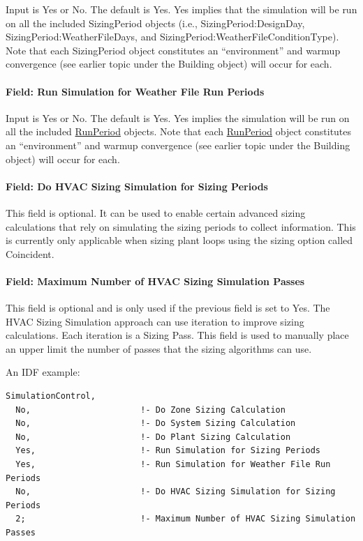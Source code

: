Input is Yes or No. The default is Yes. Yes implies that the simulation will be run on all the included SizingPeriod objects (i.e., Sizing\-Period:\-Design\-Day, Sizing\-Period:\-Weather\-File\-Days, and Sizing\-Period:\-Weather\-File\-Condition\-Type). Note that each Sizing\-Period object constitutes an ``environment'' and warmup convergence (see earlier topic under the Building object) will occur for each.

\paragraph{Field: Run Simulation for Weather File Run Periods}\label{field-run-simulation-for-weather-file-run-periods}

Input is Yes or No. The default is Yes. Yes implies the simulation will be run on all the included \hyperref[runperiod]{RunPeriod} objects. Note that each \hyperref[runperiod]{RunPeriod} object constitutes an ``environment'' and warmup convergence (see earlier topic under the Building object) will occur for each.

\paragraph{Field: Do HVAC Sizing Simulation for Sizing Periods}\label{field-do-hvac-sizing-simulation-for-sizing-periods}

This field is optional. It can be used to enable certain advanced sizing calculations that rely on simulating the sizing periods to collect information. This is currently only applicable when sizing plant loops using the sizing option called Coincident.

\paragraph{Field: Maximum Number of HVAC Sizing Simulation Passes}\label{field-maximum-number-of-hvac-sizing-simulation-passes}

This field is optional and is only used if the previous field is set to Yes. The HVAC Sizing Simulation approach can use iteration to improve sizing calculations. Each iteration is a Sizing Pass. This field is used to manually place an upper limit the number of passes that the sizing algorithms can use.

An IDF example:

\begin{lstlisting}
SimulationControl,
  No,                      !- Do Zone Sizing Calculation
  No,                      !- Do System Sizing Calculation
  No,                      !- Do Plant Sizing Calculation
  Yes,                     !- Run Simulation for Sizing Periods
  Yes,                     !- Run Simulation for Weather File Run Periods
  No,                      !- Do HVAC Sizing Simulation for Sizing Periods
  2;                       !- Maximum Number of HVAC Sizing Simulation Passes
\end{lstlisting}

